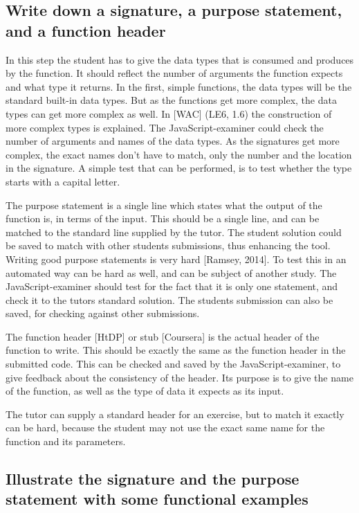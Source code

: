 \documentclass{article}
\begin{document}
\subsection{Write down a signature, a purpose statement, and a function header}
In this step the student has to give the data types that is consumed and produces
by the function.
It should reflect the number of arguments the function expects and what type it
returns.
In the first, simple functions, the data types will be the standard built-in
data types. But as the functions get more complex, the data types can get more
complex as well.
In [WAC] (LE6, 1.6) the construction of more complex types is explained.
The JavaScript-examiner could check the number of arguments and names of the
data types. As the signatures get more complex, the exact names don't have to
match, only the number and the location in the signature. A simple test that
can be performed, is to test whether the type starts with a capital letter.

The purpose statement is a single line which states what the output of the
function is, in terms of the input. This should be a single line, and can be
matched to the standard line supplied by the tutor.
The student solution could be saved to match with other students submissions,
thus enhancing the tool.
Writing good purpose statements is very hard [Ramsey, 2014].
To test this in an automated way can be hard as well, and can be subject of
another study. The JavaScript-examiner should test for the fact that it is only
one statement, and check it to the tutors standard solution. The students
submission can also be saved, for checking against other submissions.


The function header [HtDP] or stub [Coursera] is the actual header of the
function to write. This should be exactly the same as the function header in the
submitted code.
This can be checked and saved by the JavaScript-examiner, to give feedback about
the consistency of the header.
Its purpose is to give the name of the function, as well as the type of data it
expects as its input.

The tutor can supply a standard header for an exercise, but to match it exactly
can be hard, because the student may not use the exact same name for the
function and its parameters.


\subsection{Illustrate the signature and the purpose statement with some functional examples}
\end{document}
